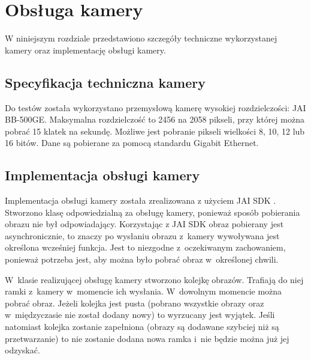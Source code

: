\chapter{Obsługa kamery}
\label{cha:obslugakamery}

W niniejszym rozdziale przedstawiono szczegóły techniczne wykorzystanej kamery oraz implementację obsługi kamery.

\section{Specyfikacja techniczna kamery}
\label{sec:specyfikacjaKamery}

Do testów została wykorzystano przemysłową kamerę wysokiej rozdzielczości: JAI BB-500GE. Maksymalna rozdzielczość to 2456 na 2058 pikseli, przy której można pobrać 15 klatek na sekundę. Możliwe jest pobranie pikseli wielkości 8, 10, 12 lub 16 bitów. Dane są pobierane za pomocą standardu Gigabit Ethernet. 

\section{Implementacja obsługi kamery}
\label{sec:implementacjaKamery}

Implementacja obsługi kamery została zrealizowana z użyciem JAI SDK \cite{JAISDK}. Stworzono klasę odpowiedzialną za obsługę kamery, ponieważ sposób pobierania obrazu nie był odpowiadający. Korzystając z JAI SDK obraz pobierany jest asynchronicznie, to znaczy po wysłaniu obrazu z~kamery wywoływana jest określona wcześniej funkcja. Jest to niezgodne z~oczekiwanym zachowaniem, ponieważ potrzeba jest, aby można było pobrać obraz w~określonej chwili.

W~klasie realizującej obsługę kamery stworzono kolejkę obrazów. Trafiają do niej ramki z~kamery w~momencie ich wysłania. W~dowolnym momencie można pobrać obraz. Jeżeli kolejka jest pusta (pobrano wszystkie obrazy oraz w~międzyczasie nie został dodany nowy) to wyrzucany jest wyjątek. Jeśli natomiast kolejka zostanie zapełniona (obrazy są dodawane szybciej niż są przetwarzanie) to nie zostanie dodana nowa ramka i~nie będzie można już jej odzyskać.
